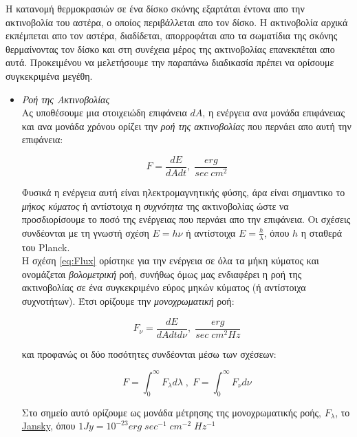 Η κατανομή θερμοκρασιών σε ένα δίσκο σκόνης εξαρτάται έντονα απο την ακτινοβολία του αστέρα, ο οποίος περιβάλλεται απο τον δίσκο. Η ακτινοβολία αρχικά εκπέμπεται απο τον αστέρα, διαδίδεται, απορροφάται απο τα σωματίδια της σκόνης θερμαίνοντας τον δίσκο και στη συνέχεια μέρος της ακτινοβολίας επανεκπέται απο αυτά. Προκειμένου να μελετήσουμε την παραπάνω διαδικασία πρέπει να ορίσουμε συγκεκριμένα μεγέθη.

\begin{itemize}
 
 \item {\it Ροή της Ακτινοβολίας}\\
  
Ας υποθέσουμε μια στοιχειώδη επιφάνεια $dA$, η ενέργεια ανα μονάδα επιφάνειας και ανα μονάδα χρόνου ορίζει την {\it ροή της ακτινοβολίας} που περνάει απο αυτή την επιφάνεια:

\begin{equation}\label{eq:Flux}
  F=\frac{dE}{dAdt}, \; \frac{erg}{sec \; cm^2}
\end{equation}

Φυσικά η ενέργεια αυτή είναι ηλεκτρομαγνητικής φύσης, άρα είναι σημαντικο το {\it μήκος κύματος} ή αντίστοιχα η {\it συχνότητα} της ακτινοβολίας ώστε να προσδιορίσουμε το ποσό της ενέργειας που περνάει απο την επιφάνεια. Οι σχέσεις συνδέονται με τη γνωστή σχέση $E=h \nu $ ή αντίστοιχα $E=\frac{h}{\lambda}$, όπου $h$ η σταθερά του {\en Planck}.\\

Η σχέση \eqref{eq:Flux} ορίστηκε για την ενέργεια σε όλα τα μήκη κύματος και ονομάζεται {\it βολομετρική} ροή, συνήθως όμως μας ενδιαφέρει η ροή της ακτινοβολίας σε ένα συγκεκριμένο εύρος μηκών κύματος (ή αντίστοιχα συχνοτήτων). Έτσι ορίζουμε την {\it μονοχρωματική} ροή:

\begin{equation}\label{eq:FluxBolometric}
  F_{\nu} =\frac{dE}{dAdtd\nu}, \; \frac{erg}{sec \; cm^2 Hz}  
\end{equation}

 και προφανώς οι δύο ποσότητες συνδέονται μέσω των σχέσεων:
 
 \begin{equation}\label{eq:FluxBolMon}
  F= \int_{0}^{\infty} F_{\lambda} d\lambda \; , \; F= \int_{0}^{\infty} F_{\nu} d\nu
\end{equation}
 
Στο σημείο αυτό ορίζουμε ως μονάδα μέτρησης της μονοχρωματικής ροής, $F_{\lambda}$, το \underline{{\en Jansky}}, όπου $1 Jy= 10^{-23} erg \; sec^{-1} \; cm^{-2} \; Hz^{-1}$\\


\end{itemize}
